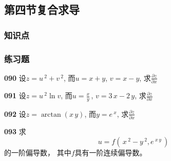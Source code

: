 \documentclass[a4paper,10pt]{article} %
\begin{document}


\textheight


\newpage
\subsection{第四节\quad 复合求导}
\subsubsection{知识点}
\subsubsection{练习题}

\par\noindent \textbf{090} \quad 设$z=u\,^2+v\,^2$, 而$u=x+y$, $v=x-y$, 求$\displaystyle\frac{\partial z}{\partial x}$





\textheight


\par\noindent \textbf{091} \quad 设$z=u\,^2\ln v$, 而$\displaystyle u=\frac{x}{y}$\,, $v=3\,x-2\,y$, 求$\displaystyle\frac{\partial z}{\partial x}$





\textheight


\par\noindent \textbf{092} \quad 设$z=\arctan (x\,y)$, 而$y=e\,^x$, 求$\displaystyle\frac{\partial z}{\partial x}$





\textheight


\par\noindent \textbf{093} \quad 求
$$u=f\left(\,x\,^2-y\,^2, e\,^{x\,y}\,\right)$$
的一阶偏导数， 其中$f$具有一阶连续偏导数。





\textheight
\end{document}
